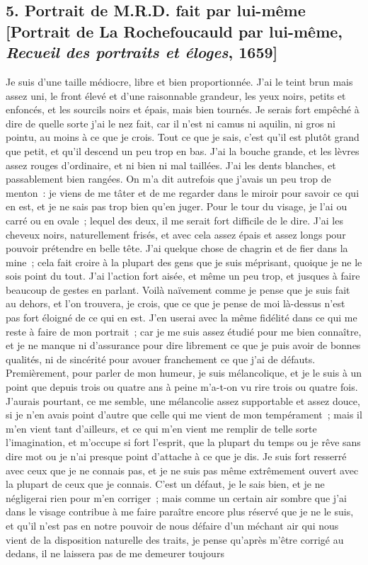 \documentclass[french,twoside]{book} %
\begin{document}
\subsection[{5. Portrait de M.R.D. fait par lui-même [Portrait de La Rochefoucauld par lui-même, Recueil des portraits et éloges, 1659]}]{5. Portrait de M.R.D. fait par lui-même [Portrait de La Rochefoucauld par lui-même, {\itshape Recueil des portraits et éloges}, 1659]}
\noindent Je suis d’une taille médiocre, libre et bien proportionnée. J’ai le teint brun mais assez uni, le front élevé et d’une raisonnable grandeur, les yeux noirs, petits et enfoncés, et les sourcils noirs et épais, mais bien tournés. Je serais fort empêché à dire de quelle sorte j’ai le nez fait, car il n’est ni camus ni aquilin, ni gros ni pointu, au moins à ce que je crois. Tout ce que je sais, c’est qu’il est plutôt grand que petit, et qu’il descend un peu trop en bas. J’ai la bouche grande, et les lèvres assez rouges d’ordinaire, et ni bien ni mal taillées. J’ai les dents blanches, et passablement bien rangées. On m’a dit autrefois que j’avais un peu trop de menton : je viens de me tâter et de me regarder dans le miroir pour savoir ce qui en est, et je ne sais pas trop bien qu’en juger. Pour le tour du visage, je l’ai ou carré ou en ovale ; lequel des deux, il me serait fort difficile de le dire. J’ai les cheveux noirs, naturellement frisés, et avec cela assez épais et assez longs pour pouvoir prétendre en belle tête. J’ai quelque chose de chagrin et de fier dans la mine ; cela fait croire à la plupart des gens que je suis méprisant, quoique je ne le sois point du tout. J’ai l’action fort aisée, et même un peu trop, et jusques à faire beaucoup de gestes en parlant. Voilà naïvement comme je pense que je suis fait au dehors, et l’on trouvera, je crois, que ce que je pense de moi là-dessus n’est pas fort éloigné de ce qui en est. J’en userai avec la même fidélité dans ce qui me reste à faire de mon portrait ; car je me suis assez étudié pour me bien connaître, et je ne manque ni d’assurance pour dire librement ce que je puis avoir de bonnes qualités, ni de sincérité pour avouer franchement ce que j’ai de défauts. Premièrement, pour parler de mon humeur, je suis mélancolique, et je le suis à un point que depuis trois ou quatre ans à peine m’a-t-on vu rire trois ou quatre fois. J’aurais pourtant, ce me semble, une mélancolie assez supportable et assez douce, si je n’en avais point d’autre que celle qui me vient de mon tempérament ; mais il m’en vient tant d’ailleurs, et ce qui m’en vient me remplir de telle sorte l’imagination, et m’occupe si fort l’esprit, que la plupart du temps ou je rêve sans dire mot ou je n’ai presque point d’attache à ce que je dis. Je suis fort resserré avec ceux que je ne connais pas, et je ne suis pas même extrêmement ouvert avec la plupart de ceux que je connais. C’est un défaut, je le sais bien, et je ne négligerai rien pour m’en corriger ; mais comme un certain air sombre que j’ai dans le visage contribue à me faire paraître encore plus réservé que je ne le suis, et qu’il n’est pas en notre pouvoir de nous défaire d’un méchant air qui nous vient de la disposition naturelle des traits, je pense qu’après m’être corrigé au dedans, il ne laissera pas de me demeurer toujours 
\end{document}
